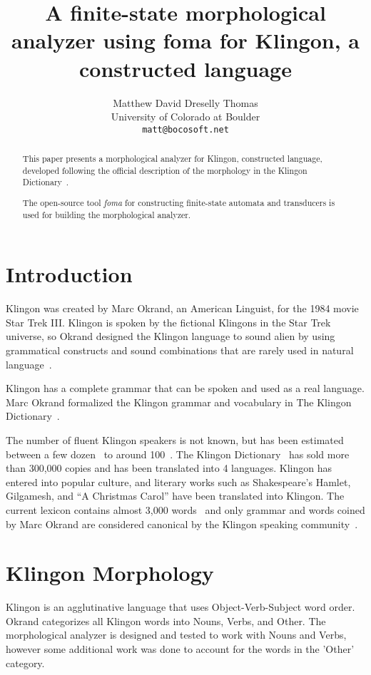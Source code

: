 \documentclass[11pt]{article}
\title{A finite-state morphological analyzer using foma for Klingon, a constructed language}
\author{Matthew David Dreselly Thomas \\
  University of Colorado at Boulder \\
  {\tt matt@bocosoft.net} \\}
\date{}
\begin{document}
\maketitle
\begin{abstract}
This paper presents a morphological analyzer for Klingon, constructed language, developed following the official description of the morphology in the Klingon Dictionary~\cite{Okrand:92}.

The open-source tool \textit{foma} for constructing finite-state automata and transducers is used for building the morphological analyzer.

\end{abstract}

\section{Introduction}

Klingon was created by Marc Okrand, an American Linguist, for the 1984 movie Star Trek III. Klingon is spoken by the fictional Klingons in the Star Trek universe, so Okrand designed the Klingon language to sound alien by using grammatical constructs and sound combinations that are rarely used in natural language~\cite{KLI:Development,KLI:Sounds}.

Klingon has a complete grammar that can be spoken and used as a real language. Marc Okrand formalized the Klingon grammar and vocabulary in The Klingon Dictionary~\cite{Okrand:92}.

The number of fluent Klingon speakers is not known, but has been estimated between a few dozen~\cite{Okrent:09} to around 100~\cite{Kelly:13}. The Klingon Dictionary~\cite{Okrand:92} has sold more than 300,000 copies and has been translated into 4 languages. Klingon has entered into popular culture, and literary works such as Shakespeare's Hamlet, Gilgamesh, and ``A Christmas Carol'' have been translated into Klingon. The current lexicon contains almost 3,000 words~\cite{Zrajm:12} and only grammar and words coined by Marc Okrand are considered canonical by the Klingon speaking community~\cite{KLI:Canonical}.

\section{Klingon Morphology}

Klingon is an agglutinative language that uses Object-Verb-Subject word order. Okrand categorizes all Klingon words into Nouns, Verbs, and Other. The morphological analyzer is designed and tested to work with Nouns and Verbs, however some additional work was done to account for the words in the 'Other' category.
\end{document}
